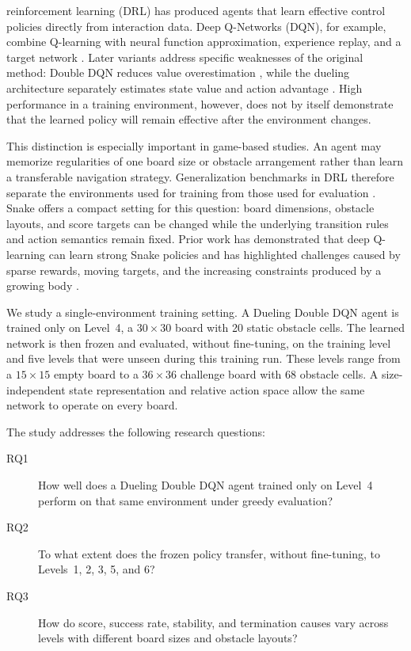 \documentclass[journal]{IEEEtran}
\newcommand{\methodname}{Dueling Double DQN}
\begin{document}
 reinforcement learning (DRL) has produced agents that learn effective
control policies directly from interaction data. Deep Q-Networks (DQN), for
example, combine Q-learning \cite{watkins1992qlearning} with neural function
approximation, experience replay, and a target network
\cite{mnih2015human}. Later variants address specific weaknesses of the
original method: Double DQN reduces value overestimation
\cite{vanhasselt2016deep}, while the dueling architecture separately estimates
state value and action advantage \cite{wang2016dueling}. High performance in a
training environment, however, does not by itself demonstrate that the learned
policy will remain effective after the environment changes.

This distinction is especially important in game-based studies. An agent may
memorize regularities of one board size or obstacle arrangement rather than
learn a transferable navigation strategy. Generalization benchmarks in DRL
therefore separate the environments used for training from those used for
evaluation \cite{cobbe2020leveraging}. Snake offers a compact setting for this
question: board dimensions, obstacle layouts, and score targets can be changed
while the underlying transition rules and action semantics remain fixed. Prior
work has demonstrated that deep Q-learning can learn strong Snake policies and
has highlighted challenges caused by sparse rewards, moving targets, and the
increasing constraints produced by a growing body \cite{wei2018autonomous}.

We study a single-environment training setting. A \methodname{} agent is trained
only on Level~4, a $30\times30$ board with 20 static obstacle cells. The learned
network is then frozen and evaluated, without fine-tuning, on the training level
and five levels that were unseen during this training run. These levels range
from a $15\times15$ empty board to a $36\times36$ challenge board with 68
obstacle cells. A size-independent state representation and relative action
space allow the same network to operate on every board.

The study addresses the following research questions:

\begin{description}
  \item[RQ1] How well does a \methodname{} agent trained only on Level~4 perform
  on that same environment under greedy evaluation?
  \item[RQ2] To what extent does the frozen policy transfer, without
  fine-tuning, to Levels~1, 2, 3, 5, and 6?
  \item[RQ3] How do score, success rate, stability, and termination causes vary
  across levels with different board sizes and obstacle layouts?
\end{description}
\end{document}
